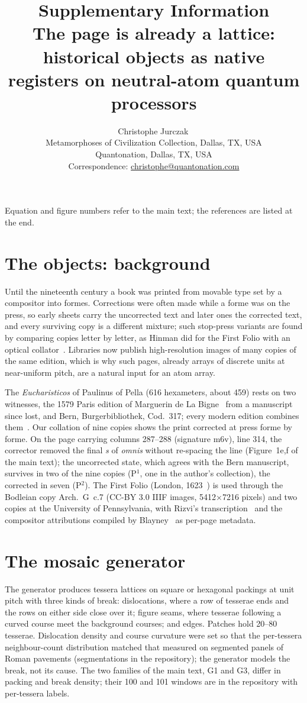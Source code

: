 \documentclass[11pt,a4paper]{article}
\title{Supplementary Information\\ \large The page is already a lattice: historical objects as native registers on neutral-atom quantum processors}
\author{Christophe Jurczak\,\orcidlink{0009-0001-8204-7333}\\ \normalsize Metamorphoses of Civilization Collection, Dallas, TX, USA\\ \normalsize Quantonation, Dallas, TX, USA\\ \normalsize Correspondence: \href{mailto:christophe@quantonation.com}{christophe@quantonation.com}}
\date{}
\begin{document}
\maketitle
\renewcommand{\thesection}{S\arabic{section}}
\renewcommand{\thetable}{S\arabic{table}}

\noindent Equation and figure numbers refer to the main text; the references are listed at the end.


\section{The objects: background}
Until the nineteenth century a book was printed from movable type set by a compositor into formes. Corrections were often made while a forme was on the press, so early sheets carry the uncorrected text and later ones the corrected text, and every surviving copy is a different mixture; such stop-press variants are found by comparing copies letter by letter, as Hinman did for the First Folio with an optical collator~\cite{hinman1963}. Libraries now publish high-resolution images of many copies of the same edition, which is why such pages, already arrays of discrete units at near-uniform pitch, are a natural input for an atom array.

The \emph{Eucharisticos} of Paulinus of Pella (616 hexameters, about 459) rests on two witnesses, the 1579 Paris edition of Marguerin de La Bigne~\cite{labigne1579} from a manuscript since lost, and Bern, Burgerbibliothek, Cod.~317; every modern edition combines them~\cite{brandes1888,moussy1974,lucarini2006}. Our collation of nine copies shows the print corrected at press forme by forme. On the page carrying columns 287--288 (signature m6v), line 314, the corrector removed the final \emph{s} of \emph{omnis} without re-spacing the line (Figure~1e,f of the main text); the uncorrected state, which agrees with the Bern manuscript, survives in two of the nine copies (P$^1$, one in the author's collection), the corrected in seven (P$^2$). The First Folio (London, 1623~\cite{shakespeare1623}) is used through the Bodleian copy Arch.~G~c.7 (CC-BY 3.0 IIIF images, 5412$\times$7216 pixels) and two copies at the University of Pennsylvania, with Rizvi's transcription~\cite{rizvi} and the compositor attributions compiled by Blayney~\cite{blayney1996} as per-page metadata.

\section{The mosaic generator}
The generator produces tessera lattices on square or hexagonal packings at unit pitch with three kinds of break: dislocations, where a row of tesserae ends and the rows on either side close over it; figure seams, where tesserae following a curved course meet the background courses; and edges. Patches hold 20--80 tesserae. Dislocation density and course curvature were set so that the per-tessera neighbour-count distribution matched that measured on segmented panels of Roman pavements (segmentations in the repository); the generator models the break, not its cause. The two families of the main text, G1 and G3, differ in packing and break density; their 100 and 101 windows are in the repository with per-tessera labels.
\end{document}
